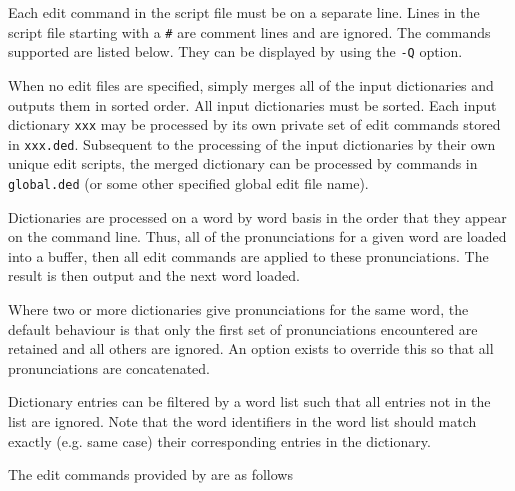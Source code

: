 Each edit command in the script file must be on a separate line.  Lines in the
script file starting with a \texttt{\#} are comment lines and are ignored.  The
commands supported are listed below.  They can be displayed by 
using the \texttt{-Q} option.

When no edit files are specified,  simply merges all of
the input dictionaries and outputs them in sorted order.  All input
dictionaries must be sorted.  Each input dictionary \texttt{xxx} may be
processed by its own private set of edit commands stored in \texttt{xxx.ded}.
Subsequent to the processing of the input dictionaries by their own
unique edit scripts, the merged dictionary can be processed by
commands in \texttt{global.ded} (or some other specified 
global edit file name).

Dictionaries are processed on a word by word basis in the order that
they appear on the command line.  Thus, all of 
the pronunciations for a given word are loaded into a buffer, then
all edit commands are applied to these pronunciations.  The result
is then output and the next word loaded.

Where two or more dictionaries give pronunciations for the same word,
the default behaviour is that only the first set of pronunciations
encountered are retained and all others are ignored.  An option exists
to override this so that all pronunciations are concatenated.

Dictionary entries can be filtered by a word list such that all entries not in
the list are ignored. Note that the word identifiers in the word list should
match exactly (e.g. same case) their corresponding entries in the dictionary.

The edit commands provided by  are as follows



